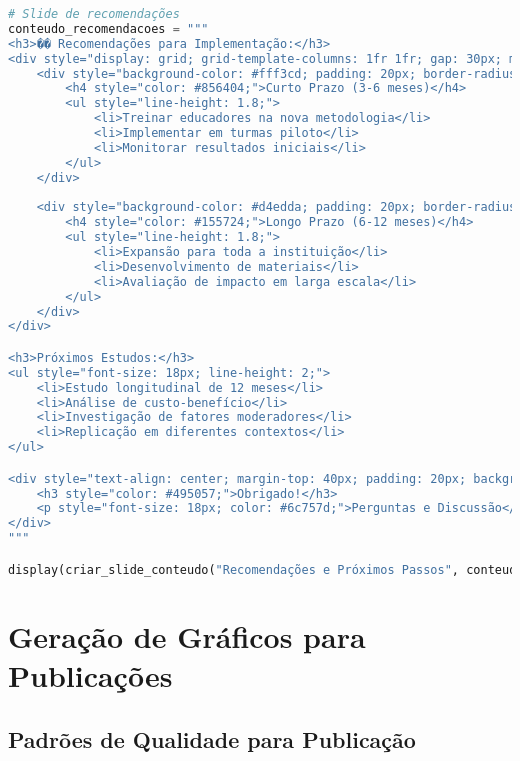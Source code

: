 \begin{pythonbox}
\begin{lstlisting}[language=Python]
# Slide de recomendações
conteudo_recomendacoes = """
<h3>�� Recomendações para Implementação:</h3>
<div style="display: grid; grid-template-columns: 1fr 1fr; gap: 30px; margin: 30px 0;">
    <div style="background-color: #fff3cd; padding: 20px; border-radius: 8px; border-left: 4px solid #ffc107;">
        <h4 style="color: #856404;">Curto Prazo (3-6 meses)</h4>
        <ul style="line-height: 1.8;">
            <li>Treinar educadores na nova metodologia</li>
            <li>Implementar em turmas piloto</li>
            <li>Monitorar resultados iniciais</li>
        </ul>
    </div>
    
    <div style="background-color: #d4edda; padding: 20px; border-radius: 8px; border-left: 4px solid #28a745;">
        <h4 style="color: #155724;">Longo Prazo (6-12 meses)</h4>
        <ul style="line-height: 1.8;">
            <li>Expansão para toda a instituição</li>
            <li>Desenvolvimento de materiais</li>
            <li>Avaliação de impacto em larga escala</li>
        </ul>
    </div>
</div>

<h3>Próximos Estudos:</h3>
<ul style="font-size: 18px; line-height: 2;">
    <li>Estudo longitudinal de 12 meses</li>
    <li>Análise de custo-benefício</li>
    <li>Investigação de fatores moderadores</li>
    <li>Replicação em diferentes contextos</li>
</ul>

<div style="text-align: center; margin-top: 40px; padding: 20px; background-color: #f8f9fa; border-radius: 10px;">
    <h3 style="color: #495057;">Obrigado!</h3>
    <p style="font-size: 18px; color: #6c757d;">Perguntas e Discussão</p>
</div>
"""

display(criar_slide_conteudo("Recomendações e Próximos Passos", conteudo_recomendacoes))
\end{lstlisting}
\end{pythonbox}

\section{Geração de Gráficos para Publicações}

\subsection{Padrões de Qualidade para Publicação}

